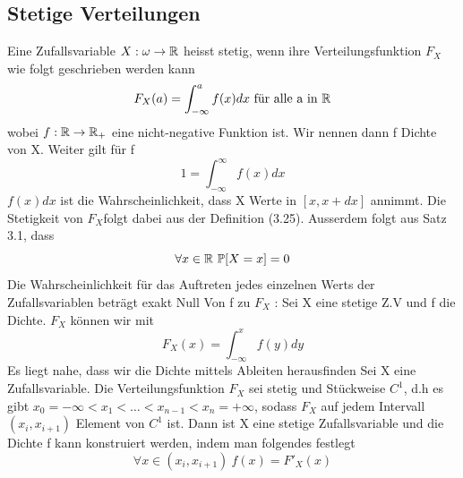 \subsection{Stetige Verteilungen}
 \newline
Eine Zufallsvariable \( X: \omega \rightarrow \mathbb{R} \) heisst stetig, wenn ihre Verteilungsfunktion \(F_X \) wie folgt geschrieben werden kann \[F_X(a) = \int_{-\infty}^{a} f(x)dx \ \text{für alle a in} \ \mathbb{R}\] wobei \(f: \mathbb{R} \rightarrow \mathbb{R}_+\) eine nicht-negative Funktion ist. Wir nennen dann f Dichte von X. Weiter gilt für f \[1 = \int_{-\infty}^{\infty} f(x) dx\] \newline
\Bem[3.25A] \newline
\(f(x)dx \) ist die Wahrscheinlichkeit, dass X Werte in \( [x, x+ dx]\) annimmt. Die Stetigkeit von \(F_X \)folgt dabei aus der Definition (3.25). Ausserdem folgt aus Satz 3.1, dass \[ \forall x \in \mathbb{R}  \ \mathbb{P}[X = x] = 0\]Die Wahrscheinlichkeit für das Auftreten jedes einzelnen Werts der Zufallsvariablen beträgt exakt Null\newline
\Bem[3.25B] \newline
Von f zu \( F_X\) : Sei X eine stetige Z.V und f die Dichte. \(F_X\) können wir mit \[F_X(x) = \int_{-\infty}^x f(y)dy\] Es liegt nahe, dass wir die Dichte mittels Ableiten herausfinden \newline
\Theo[3.26] \newline
Sei X eine Zufallsvariable. Die Verteilungsfunktion \(F_X\) sei stetig und Stückweise \( C^1\), d.h es gibt \(x_0 = -\infty < x_1 < \dots < x_{n-1} < x_n = + \infty\), sodass \(F_X\) auf jedem Intervall \( (x_i, x_{i+1})\) Element von \(C^1\) ist. Dann ist X eine stetige Zufallsvariable und die Dichte f kann konstruiert werden, indem man folgendes festlegt \[ \forall x \in (x_i, x_{i+1}) \ f(x) = F'_X(x)\]
